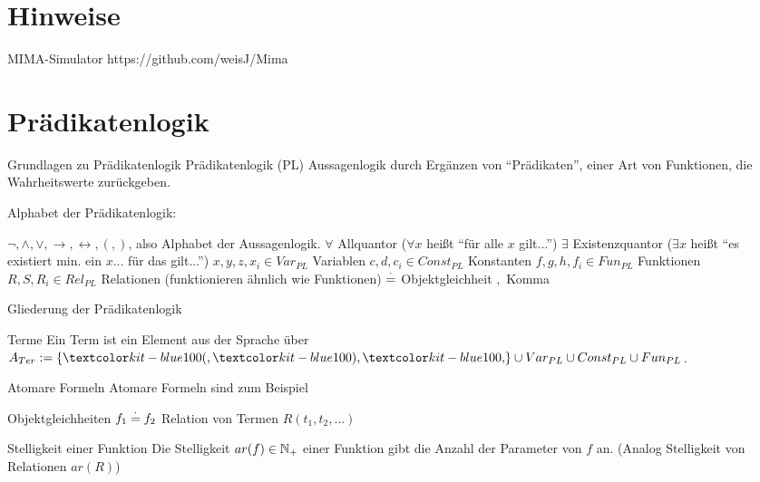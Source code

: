 \documentclass[handout]{beamer}
\begin{document}

\begin{frame}
	\titlepage
\end{frame}

\section{Hinweise}

\begin{frame} {MIMA-Simulator}
https://github.com/weisJ/Mima
\end{frame}

\section{Prädikatenlogik}
\begin{frame}{Grundlagen zu Prädikatenlogik}
	Prädikatenlogik (PL) \ip {} Aussagenlogik durch Ergänzen von ``Prädikaten'', einer Art von Funktionen, die Wahrheitswerte zurückgeben.

	Alphabet der Prädikatenlogik:
	
	\begin{itemize}
		\pitem $\lnot, \land, \lor, \rightarrow, \leftrightarrow, (, )$, also Alphabet der Aussagenlogik.
		\pitem $\forall$ Allquantor \ip ($\forall x$ heißt ``für alle $x$ gilt...'')
		\pitem $\exists$ Existenzquantor \ip ($\exists x$ heißt ``es existiert min. ein $x$... für das gilt...'')
		\pitem $x,y,z,x_i \in Var_{PL}$ Variablen
		\pitem $c, d, c_i \in Const_{PL}$ Konstanten
		\pitem $f, g, h, f_i \in Fun_{PL}$ Funktionen 
		\pitem $R, S, R_i \in Rel_{PL}$ Relationen (funktionieren ähnlich wie Funktionen)
		\pitem $\stackrel{\cdot}{=}$ Objektgleichheit
		\pitem $,$ Komma
	\end{itemize}
\end{frame}

\begin{frame}{Gliederung der Prädikatenlogik}
	\begin{block}{Terme}
		Ein Term ist ein Element aus der Sprache über $A_{Ter} := \{\markBlue{(}, \markBlue{)}, \markBlue{,}\} \cup Var_{PL} \cup Const_{PL} \cup Fun_{PL}$.
	\end{block}
	
	\begin{block}{Atomare Formeln}
		Atomare Formeln sind zum Beispiel
		\begin{itemize}
			\pitem Objektgleichheiten $f_1 \stackrel{\cdot}{=} f_2$
			\pitem Relation von Termen $R(t_1, t_2, ...)$
		\end{itemize}
	\end{block}

	\begin{block}{Stelligkeit einer Funktion}
		Die Stelligkeit $ar(f) \in \mathbb{N}_+$ einer Funktion gibt die Anzahl der Parameter von $f$ an. \ip (Analog Stelligkeit von Relationen $ar(R)$)
	\end{block}
	
\end{frame}
\end{document}
